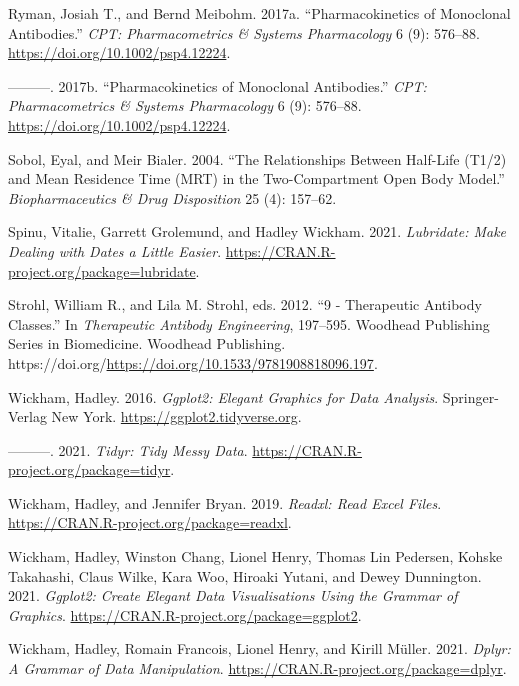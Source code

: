 \documentclass[
  11pt,
  krantz2, a4paper, twoside]{krantz}
\newlength{\cslhangindent}
\newenvironment{CSLReferences}[2] %
 {\begin{list}{}{%
  \setlength{\itemindent}{0pt}
  \setlength{\leftmargin}{0pt}
  \setlength{\parsep}{0pt}
  \ifodd #1
   \setlength{\leftmargin}{\cslhangindent}
   \setlength{\itemindent}{-1\cslhangindent}
  \fi
  \setlength{\itemsep}{#2\baselineskip}}}
 {\end{list}}
\theoremstyle{definition}
\theoremstyle{definition}
\theoremstyle{definition}
\theoremstyle{definition}
\theoremstyle{remark}
\begin{document}
\begin{CSLReferences}{1}{0}
Ryman, Josiah T., and Bernd Meibohm. 2017a. {``Pharmacokinetics of Monoclonal Antibodies.''} \emph{{CPT}: Pharmacometrics {\&} Systems Pharmacology} 6 (9): 576--88. \url{https://doi.org/10.1002/psp4.12224}.

---------. 2017b. {``Pharmacokinetics of Monoclonal Antibodies.''} \emph{{CPT}: Pharmacometrics {\&} Systems Pharmacology} 6 (9): 576--88. \url{https://doi.org/10.1002/psp4.12224}.

Sobol, Eyal, and Meir Bialer. 2004. {``The Relationships Between Half-Life (T1/2) and Mean Residence Time (MRT) in the Two-Compartment Open Body Model.''} \emph{Biopharmaceutics \& Drug Disposition} 25 (4): 157--62.

Spinu, Vitalie, Garrett Grolemund, and Hadley Wickham. 2021. \emph{Lubridate: Make Dealing with Dates a Little Easier}. \url{https://CRAN.R-project.org/package=lubridate}.

Strohl, William R., and Lila M. Strohl, eds. 2012. {``9 - Therapeutic Antibody Classes.''} In \emph{Therapeutic Antibody Engineering}, 197--595. Woodhead Publishing Series in Biomedicine. Woodhead Publishing. https://doi.org/\url{https://doi.org/10.1533/9781908818096.197}.

Wickham, Hadley. 2016. \emph{Ggplot2: Elegant Graphics for Data Analysis}. Springer-Verlag New York. \url{https://ggplot2.tidyverse.org}.

---------. 2021. \emph{Tidyr: Tidy Messy Data}. \url{https://CRAN.R-project.org/package=tidyr}.

Wickham, Hadley, and Jennifer Bryan. 2019. \emph{Readxl: Read Excel Files}. \url{https://CRAN.R-project.org/package=readxl}.

Wickham, Hadley, Winston Chang, Lionel Henry, Thomas Lin Pedersen, Kohske Takahashi, Claus Wilke, Kara Woo, Hiroaki Yutani, and Dewey Dunnington. 2021. \emph{Ggplot2: Create Elegant Data Visualisations Using the Grammar of Graphics}. \url{https://CRAN.R-project.org/package=ggplot2}.

Wickham, Hadley, Romain Francois, Lionel Henry, and Kirill Müller. 2021. \emph{Dplyr: A Grammar of Data Manipulation}. \url{https://CRAN.R-project.org/package=dplyr}.


\end{CSLReferences}
\end{document}
